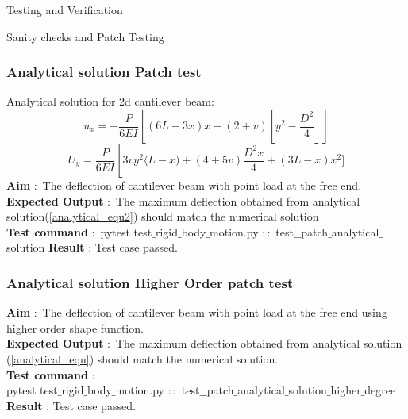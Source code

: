 \documentclass[a4paper,12pt,times]{article}
\begin{document}
\begin{section}{Testing and Verification}
\begin{subsection}{Sanity checks and Patch Testing}
\subsubsection{Analytical solution Patch test}
Analytical solution for 2d cantilever beam:\\
\begin{equation}\label{analytical_equ}
u_{x}=-\frac{P}{6 E I}\left[(6 L-3 x) x+(2+v)\left[y^{2}-\frac{D^{2}}{4}\right]\right]
\end{equation}
\begin{equation}\label{analytical_equ2}
U_{y}=\frac{P}{6 E I}\left[3 v y^{2}\langle L-x)+(4+5 v)\frac{D^{2} x}{4}+(3L-x) x^{2}]\right.
\end{equation}
\textbf{Aim} $\colon$ The deflection of cantilever beam with point load at the free end. \\ 
\textbf{Expected Output} $\colon$ The maximum deflection obtained from analytical solution(\ref{analytical_equ2}) should match the numerical solution\\
\textbf{Test command} $\colon$
 pytest test$\_$rigid$\_$body$\_$motion.py $\colon \colon $ test$\_ \_$patch$\_$analytical$\_$solution
\textbf{Result} : Test case passed. 


\subsubsection{Analytical solution Higher Order patch test}


\textbf{Aim} $\colon$ The deflection of cantilever beam with point load at the free end using higher order shape function. \\ 
\textbf{Expected Output} $\colon$ The maximum deflection obtained from analytical solution (\ref{analytical_equ}) should match the numerical solution.\\
\textbf{Test command} $\colon$ \\pytest test$\_$rigid$\_$body$\_$motion.py $\colon \colon $ 
 test$\_ \_$patch$\_$analytical$\_$solution$\_$higher$\_$degree
\textbf{Result} : Test case passed.
\citep{10.5555/265261}

\end{subsection}



\end{section}
\end{document}
